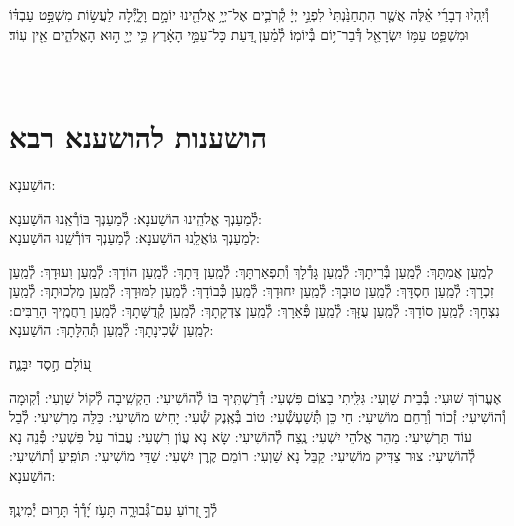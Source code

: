 \documentclass[twoside, openany, parskip=half, 11pt]{book}
\begin{document}
וְ֯יִֽהְי֨וּ דְבָרַ֜י אֵ֗לֶּה אֲשֶׁ֤ר הִתְחַנַּ֙נְתִּי֙ לִפְנֵ֣י יְיָ֔ קְ֯רֹבִ֛ים אֶל־יְיָ֥ אֱלֹהֵ֖ינוּ יוֹמָ֣ם וָלָ֑יְ֯לָה לַעֲשׂ֣וֹת מִשְׁפַּ֣ט עַבְדּ֗וֹ וּמִשְׁפַּ֛ט עַמּ֥וֹ יִשְׂרָאֵ֖ל דְּ֯בַר־י֥וֹם בְּ֯יוֹמֽוֹ׃ לְ֯מַ֗עַן דַּ֚עַת כָּל־עַמֵּ֣י הָאָ֔רֶץ כִּ֥י יְיָ֖ ה֣וּא הָאֱלֹהִ֑ים אֵ֖ין עֽוֹד׃

\vfill
{}\\

\clearpage

\vspace{-1\baselineskip}
\section[הושענות להושענא רבא]{ הושענות להושענא רבא }

\begin{Large}
הוֹשַׁענָא:
\end{Large}


לְ֯מַעַנְךָ אֱלֹהֵֽינוּ הוֹשַׁענָא: לְ֯מַעַנְךָ בּוֹרְ֯אֵֽנוּ הוֹשַׁענָא:\\
לְמַעַנְךָ גּוֹאֲלֵֽנוּ הוֹשַׁענָא: לְ֯מַעַנְךָ דּוֹרְ֯שֵֽׁנוּ הוֹשַׁענָא:

לְמַֽעַן אֲמִתָּךְ: לְ֯מַֽעַן בְּ֯רִיתָךְ: לְ֯מַֽעַן גָּדְ֯לָךְ וְ֯תִפְאַרְתָּךְ: לְ֯מַֽעַן דָּתָךְ: לְ֯מַֽעַן הוֹדָךְ: לְ֯מַֽעַן וִעוּדָךְ: לְ֯מַֽעַן זִכְרָךְ: לְ֯מַֽעַן חַסְדָּךְ: לְ֯מַֽעַן טוּבָךְ: לְ֯מַֽעַן יִחוּדָךְ: לְ֯מַֽעַן כְּ֯בוֹדָךְ: לְ֯מַֽעַן לִמּוּדָךְ: לְ֯מַֽעַן מַלְכוּתָךְ: לְ֯מַֽעַן נִצְחָךְ: לְ֯מַֽעַן סוֹדָךְ: לְ֯מַֽעַן עֻזָּךְ: לְ֯מַֽעַן פְּ֯אֵרָךְ: לְ֯מַֽעַן צִדְקָתָךְ: לְ֯מַֽעַן קְ֯דֻשָּׁתָךְ: לְ֯מַֽעַן רַחֲמֶֽיךָ הָרַבִּים:
לְמַֽעַן שְׁ֯כִינָתָךְ:
לְ֯מַֽעַן תְּ֯הִלָּתָךְ: הוֹשַׁענָא:

ע֭וֹלָם חֶ֣סֶד יִבָּנֶ֑ה׃

אֶעֱרוֹךְ שׁוּעִי: בְּ֯בֵית שַׁוְעִי: גִּלִּֽיתִי בַצּוֹם פִּשְׁעִי: דְּ֯רַשְׁתִּֽיךָ בּוֹ לְ֯הוֹשִׁיעִי: הַקְשִֽׁיבָה לְ֯קוֹל שַׁוְעִי: וְ֯קֽוּמָה וְ֯הוֹשִׁיעִי: זְ֯כוֹר וְ֯רַחֵם מוֹשִׁיעִי: חַי כֵּן תְּ֯שַׁעְשְׁ֯עִי: טוֹב בְּ֯אֶֽנֶק שְׁ֯עִי: יָחִישׁ מוֹשִׁיעִי: כַּלֵּה מַרְשִׁיעִי: לְ֯בַל עוֹד תַּרְשִׁיעִי: מַהֵר אֱלֹהֵי יִשְׁעִי: נֶֽצַח לְ֯הוֹשִׁיעִי: שָׂא נָא עֲוֹן רִשְׁעִי: עֲבוֹר עַל פִּשְׁעִי: פְּ֯נֵה נָא לְ֯הוֹשִׁיעִי: צוּר צַדִּיק מוֹשִׁיעִי: קַבֵּל נָא שַׁוְעִי: רוֹמֵם קֶֽרֶן יִשְׁעִי:
שַׁדַּי מוֹשִׁיעִי:
תּוֹפִֽיעַ וְ֯תוֹשִׁיעִי: הוֹשַׁענָא:

לְ֯ךָ֣ זְ֭רוֹעַ עִם־גְּ֯בוּרָ֑ה תָּעֹ֥ז יָ֝דְ֯ךָ֗ תָּר֥וּם יְ֯מִינֶֽךָ׃
\end{document}
